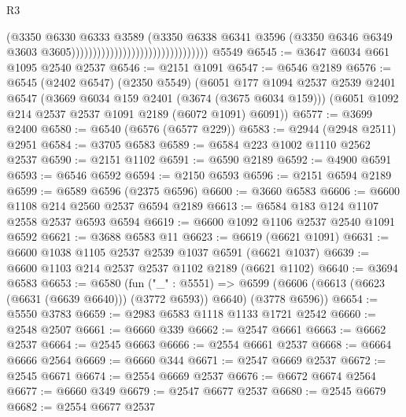 \begin{lexlean}{R3}
\begin{coremodule}
                                                              (@3350
                                                                @6330
                                                                @6333
                                                                @3589
                                                                (@3350
                                                                  @6338
                                                                  @6341
                                                                  @3596
                                                                  (@3350
                                                                    @6346
                                                                    @6349
                                                                    @3603
                                                                    @3605))))))))))))))))))))))))))))))))
    @5549
@6545 := @3647 @6034 @661 @1095 @2540 @2537
@6546 := @2151 @1091
@6547 := @6546 @2189
@6576 := @6545
    (@2402 @6547)
    (@2350 @5549)
    (@6051
      @177
      @1094
      @2537
      @2539
      @2401
      @6547
      (@3669 @6034 @159 @2401 (@3674 (@3675 @6034 @159)))
      (@6051 @1092 @214 @2537 @2537 @1091 @2189 (@6072 @1091) @6091))
@6577 := @3699 @2400
@6580 := @6540 (@6576 (@6577 @229))
@6583 := @2944 (@2948 @2511) @2951
@6584 := @3705 @6583
@6589 := @6584 @223 @1002 @1110 @2562 @2537
@6590 := @2151 @1102
@6591 := @6590 @2189
@6592 := @4900 @6591
@6593 := @6546 @6592
@6594 := @2150 @6593
@6596 := @2151 @6594 @2189
@6599 := @6589 @6596 (@2375 @6596)
@6600 := @3660 @6583
@6606 := @6600 @1108 @214 @2560 @2537 @6594 @2189
@6613 := @6584 @183 @124 @1107 @2558 @2537 @6593 @6594
@6619 := @6600 @1092 @1106 @2537 @2540 @1091 @6592
@6621 := @3688 @6583 @11
@6623 := @6619 (@6621 @1091)
@6631 := @6600 @1038 @1105 @2537 @2539 @1037 @6591 (@6621 @1037)
@6639 := @6600 @1103 @214 @2537 @2537 @1102 @2189 (@6621 @1102)
@6640 := @3694 @6583
@6653 := @6580
    (fun ("_" : @5551) =>
    @6599 (@6606 (@6613 (@6623 (@6631 (@6639 @6640))) (@3772 @6593)) @6640) (@3778 @6596))
@6654 := @5550 @3783
@6659 := @2983 @6583 @1118 @1133 @1721 @2542
@6660 := @2548 @2507
@6661 := @6660 @339
@6662 := @2547 @6661
@6663 := @6662 @2537
@6664 := @2545 @6663
@6666 := @2554 @6661 @2537
@6668 := @6664 @6666 @2564
@6669 := @6660 @344
@6671 := @2547 @6669 @2537
@6672 := @2545 @6671
@6674 := @2554 @6669 @2537
@6676 := @6672 @6674 @2564
@6677 := @6660 @349
@6679 := @2547 @6677 @2537
@6680 := @2545 @6679
@6682 := @2554 @6677 @2537

\end{coremodule}
\end{lexlean}
